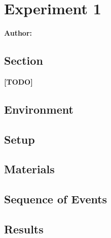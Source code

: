 \chapter{Experiment 1}

\textbf{Author: } 

\section{Section}
\textbf{[TODO]}
\newline
\lipsum[1]

\section{Environment}

\section{Setup}

\section{Materials}

\section{Sequence of Events}

\section{Results}

\filbreak